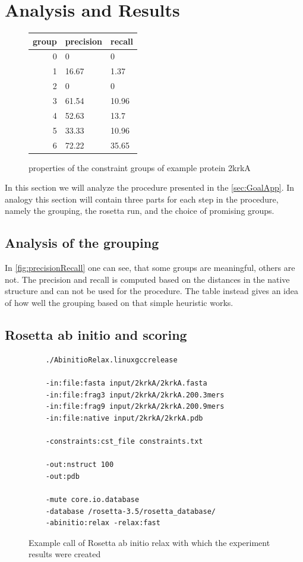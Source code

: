 \documentclass[a4paper, 11pt, parskip=half]{scrartcl}
\begin{document}
\section{Analysis and Results}
\begin{figure}
    \centering
    \begin{tabular}{ r || l | l }
      group & precision & recall \\
      \hline
      0 & 0         & 0 \\
      1 & 16.67     & 1.37 \\
      2 & 0         & 0 \\
      3 & 61.54     & 10.96 \\
      4 & 52.63     & 13.7 \\
      5 & 33.33     & 10.96 \\
      6 & 72.22     & 35.65 \\
    \end{tabular}
\caption{properties of the constraint groups of example protein 2krkA}
\label{fig:precisionRecall}
\end{figure}
In this section we will analyze the procedure presented in the \autoref{sec:GoalApp}. In analogy this section will contain three parts for each step in the procedure, namely the grouping, the rosetta run, and the choice of promising groups.
\subsection{Analysis of the grouping}
In \autoref{fig:precisionRecall} one can see, that some groups are meaningful, others are not. 
The precision and recall is computed based on the distances in the native structure and can not be used for the procedure. 
The table instead gives an idea of how well the grouping based on that simple heuristic works.
\subsection{Rosetta ab initio and scoring}
\begin{figure}
    \centering
    \begin{lstlisting}
    ./AbinitioRelax.linuxgccrelease
    
    -in:file:fasta input/2krkA/2krkA.fasta
    -in:file:frag3 input/2krkA/2krkA.200.3mers
    -in:file:frag9 input/2krkA/2krkA.200.9mers
    -in:file:native input/2krkA/2krkA.pdb
    
    -constraints:cst_file constraints.txt
    
    -out:nstruct 100
    -out:pdb
    
    -mute core.io.database
    -database /rosetta-3.5/rosetta_database/
    -abinitio:relax -relax:fast
    \end{lstlisting}
    \caption{Example call of Rosetta ab initio relax with which the experiment results were created}
    \label{fig:rosettaCall}
\end{figure}
\end{document}
